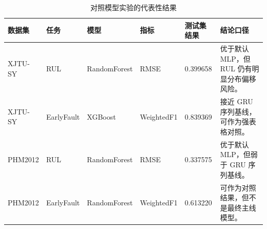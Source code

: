 \begin{table}[H]
\centering
\caption{对照模型实验的代表性结果}
\label{tab:non-mlp-summary}
\small
\begin{tabularx}{\textwidth}{p{2.5cm}p{2.8cm}p{2.8cm}p{2.4cm}p{2.2cm}Y}
\toprule
数据集 & 任务 & 模型 & 指标 & 测试集结果 & 结论口径 \\
\midrule
XJTU-SY & RUL & RandomForest & RMSE & 0.399658 & 优于默认 MLP，但 RUL 仍有明显分布偏移风险。 \\
XJTU-SY & EarlyFault & XGBoost & WeightedF1 & 0.839369 & 接近 GRU 序列基线，可作为强表格对照。 \\
PHM2012 & RUL & RandomForest & RMSE & 0.337575 & 优于默认 MLP，但弱于 GRU 序列基线。 \\
PHM2012 & EarlyFault & RandomForest & WeightedF1 & 0.613220 & 可作为对照结果，但不是最终主线模型。 \\
\bottomrule
\end{tabularx}
\end{table}
